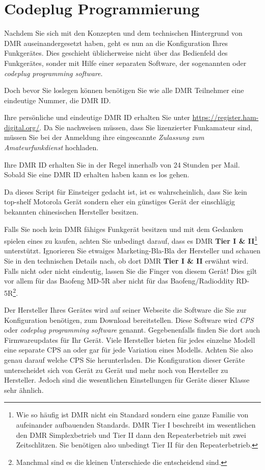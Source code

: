 \section{Codeplug Programmierung} \label{sec:codeplug}
Nachdem Sie sich mit den Konzepten und dem technischen Hintergrund von DMR auseinandergesetzt haben, geht es nun an die Konfiguration Ihres Funkgerätes. Dies geschieht üblicherweise nicht über das Bedienfeld des Funkgerätes, sonder mit Hilfe einer separaten Software, der sogenannten  oder \emph{codeplug programming software}. 

Doch bevor Sie loslegen können benötigen Sie wie alle DMR Teilnehmer eine eindeutige Nummer, die DMR ID.
\begin{hinweis}
 Ihre persönliche und eindeutige DMR ID erhalten Sie unter \url{https://register.ham-digital.org/}. Da Sie nachweisen müssen, dass Sie lizenzierter Funkamateur sind, müssen Sie bei der Anmeldung ihre eingescannte \emph{Zulassung zum Amateurfunkdienst} hochladen.
\end{hinweis}
Ihre DMR ID erhalten Sie in der Regel innerhalb von 24 Stunden per Mail. Sobald Sie eine DMR ID erhalten haben kann es los gehen.

Da dieses Script für Einsteiger gedacht ist, ist es wahrscheinlich, dass Sie kein top-shelf Motorola Gerät sondern eher ein günstiges Gerät der einschlägig bekannten chinesischen Hersteller besitzen. 

\begin{achtung}
 Falls Sie noch kein DMR fähiges Funkgerät besitzen und mit dem Gedanken spielen eines zu kaufen, achten Sie unbedingt darauf, dass es DMR \textbf{Tier I \& II}\footnote{Wie so häufig ist DMR nicht ein Standard sondern eine ganze Familie von aufeinander aufbauenden Standards. DMR Tier I beschreibt im wesentlichen den DMR Simplexbetrieb und Tier II dann den Repeaterbetrieb mit zwei Zeitschlitzen. Sie benötigen also unbedingt Tier II für den Repeaterbetrieb.} unterstützt. Ignorieren Sie etwaiges Marketing-Bla-Bla der Hersteller und schauen Sie in den technischen Details nach, ob dort DMR \textbf{Tier I \& II} erwähnt wird. Falls nicht oder nicht eindeutig, lassen Sie die Finger von diesem Gerät! Dies gilt vor allem für das Baofeng MD-5R aber nicht für das Baofeng/Radioddity RD-5R\footnote{Manchmal sind es die kleinen Unterschiede die entscheidend sind.}. 
\end{achtung}

Der Hersteller Ihres Gerätes wird auf seiner Webseite die Software die Sie zur Konfiguration benötigen, zum Download bereitstellen. Diese Software wird \emph{CPS} oder \emph{codeplug programming software} genannt. Gegebenenfalls finden Sie dort auch Firmwareupdates für Ihr Gerät. Viele Hersteller bieten für jedes einzelne Modell eine separate CPS an oder gar für jede Variation eines Modells. Achten Sie also genau darauf welche CPS Sie herunterladen. Die Konfiguration dieser Geräte unterscheidet sich von Gerät zu Gerät und mehr noch von Hersteller zu Hersteller. Jedoch sind die wesentlichen Einstellungen für Geräte dieser Klasse sehr ähnlich.

